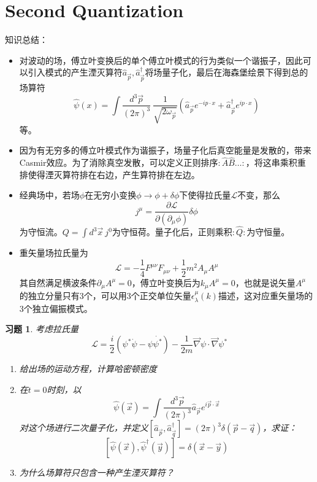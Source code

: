\documentclass[a4paper,11pt]{ctexart}
\newtheorem{ex}{习题}[section]
\newcommand{\beq}{\begin{equation}}
\newcommand{\eeq}{\end{equation}}
\newcommand{\lag}{\mathcal{L}}
\newcommand{\del}{\vec{\nabla}}
\newcommand{\pfrac}[2]{\frac{\partial #1}{\partial #2}}
\newcommand{\pvol}[1]{\frac{d^3 \vec #1}{(2\pi)^3}}
\begin{document}
\section{Second Quantization}
知识总结：
\begin{itemize}
\item 对波动的场，傅立叶变换后的单个傅立叶模式的行为类似一个谐振子，因此可以引入模式的产生湮灭算符$\hat{a}_{\vec p},\hat{a}^\dagger_{\vec p}$将场量子化，最后在海森堡绘景下得到总的场算符
\beq
\hat{\psi}(x) = \int \pvol{p} \ \frac{1}{\sqrt{2\omega_{\vec p}}} \left( \hat{a}_{\vec p}e^{-ip\cdot x} + \hat{a}^\dagger_{\vec p}e^{ip\cdot x}\right)
\eeq
等。
\item 因为有无穷多的傅立叶模式作为谐振子，场量子化后真空能量是发散的，带来Casmir效应。为了消除真空发散，可以定义正则排序$:\hat{A} \hat{B} \dots :$，将这串乘积重排使得湮灭算符排在右边，产生算符排在左边。
\item 经典场中，若场$\phi$在无穷小变换$\phi \to \phi + \delta \phi$下使得拉氏量$\lag$不变，那么
\beq
j^\mu = \pfrac{\lag}{(\partial_\mu \phi)} \delta \phi
\eeq
为守恒流。$Q = \int d^3 \vec x \ j^0$为守恒荷。量子化后，正则乘积$:\hat{Q}:$为守恒量。
\item 重矢量场拉氏量为
\beq
\lag = - \frac{1}{4} F^{\mu \nu} F_{\mu \nu} + \frac{1}{2}m^2 A_\mu A^\mu
\eeq
其自然满足横波条件$\partial_\mu A^\mu = 0$，傅立叶变换后为$k_\mu A^\mu=0$，也就是说矢量$A^\mu$的独立分量只有3个，可以用3个正交单位矢量$\epsilon_\lambda^\mu(k)$描述，这对应重矢量场的3个独立偏振模式。
\end{itemize}
\begin{ex}
考虑拉氏量
\beq
\lag =  \frac{i}{2} \left( \psi^* \dot{\psi} - \psi \dot{\psi^*}\right) - \frac{1}{2m} \del \psi \cdot \del \psi^*
\eeq
\begin{enumerate}
\item 给出场的运动方程，计算哈密顿密度
\item 在$t=0$时刻，以$$\hat{\psi} (\vec x)= \int \frac{d^3 \vec p}{(2\pi)^3} \hat{a}_{\vec p} e^{i \vec p \cdot \vec x} $$对这个场进行二次量子化，并定义$[\hat{a}_{\vec p}, \hat{a}^\dagger_{\vec q} ] = (2\pi)^3 \delta(\vec p - \vec q)$，求证：$$[\hat{\psi}(\vec x),\hat{\psi}^\dagger (\vec y)] = \delta (\vec x - \vec y)$$
\item 为什么场算符只包含一种产生湮灭算符？
\end{enumerate}
\end{ex}
\end{document}
